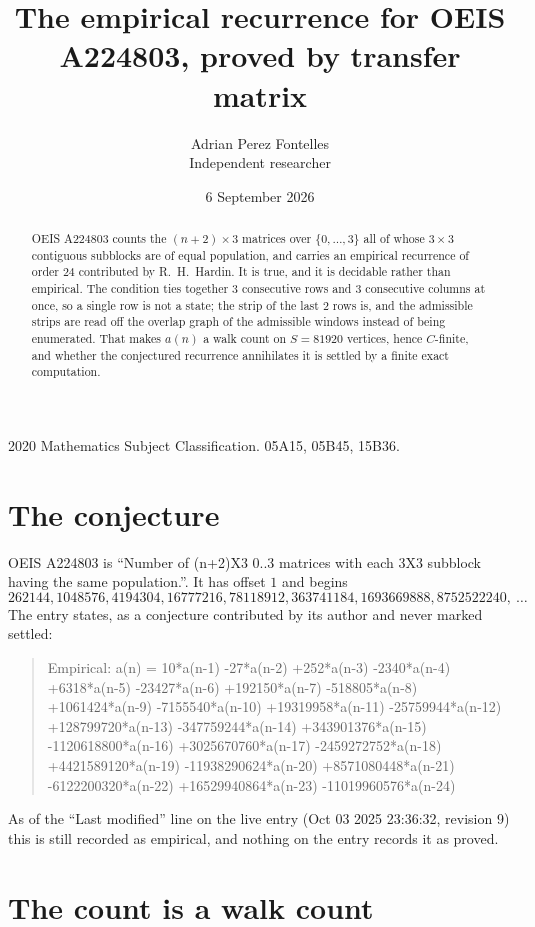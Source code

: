 \documentclass[11pt,a4paper]{article}
\title{The empirical recurrence for OEIS A224803, proved by transfer matrix}
\author{Adrian Perez Fontelles\\ \small Independent researcher}
\date{6 September 2026}
\theoremstyle{plain}
\theoremstyle{definition}
\begin{document}
\maketitle

\begin{abstract}
OEIS A224803 counts the $(n+2)\times3$ matrices over $\{0,\dots,3\}$ all of whose
$3\times3$ contiguous subblocks are of equal population, and carries an empirical recurrence of order
$24$ contributed by R.~H.~Hardin. It is true, and it is decidable rather than empirical.
The condition ties together $3$ consecutive rows and $3$ consecutive columns at once, so a
single row is not a state; the strip of the last $2$ rows is, and the admissible strips
are read off the overlap graph of the admissible windows instead of being enumerated. That
makes $a(n)$ a walk count on $S=81920$ vertices, hence $C$-finite, and whether the conjectured
recurrence annihilates it is settled by a finite exact computation.
\end{abstract}

\noindent\small 2020 Mathematics Subject Classification. 05A15, 05B45, 15B36.\normalsize

\section{The conjecture}

OEIS A224803 is ``Number of (n+2)X3 0..3 matrices with each 3X3 subblock having the same population.''. It has offset $1$ and begins
\[
262144, 1048576, 4194304, 16777216, 78118912, 363741184, 1693669888, 8752522240,\ \dots
\]
The entry states, as a conjecture contributed by its author and never marked settled:
\begin{quote}
Empirical: a(n) = 10*a(n-1) -27*a(n-2) +252*a(n-3) -2340*a(n-4) +6318*a(n-5) -23427*a(n-6) +192150*a(n-7) -518805*a(n-8) +1061424*a(n-9) -7155540*a(n-10) +19319958*a(n-11) -25759944*a(n-12) +128799720*a(n-13) -347759244*a(n-14) +343901376*a(n-15) -1120618800*a(n-16) +3025670760*a(n-17) -2459272752*a(n-18) +4421589120*a(n-19) -11938290624*a(n-20) +8571080448*a(n-21) -6122200320*a(n-22) +16529940864*a(n-23) -11019960576*a(n-24)
\end{quote}
As of the ``Last modified'' line on the live entry (Oct 03 2025 23:36:32, revision 9) this is still
recorded as empirical, and nothing on the entry records it as proved.

\section{The count is a walk count}
\end{document}

